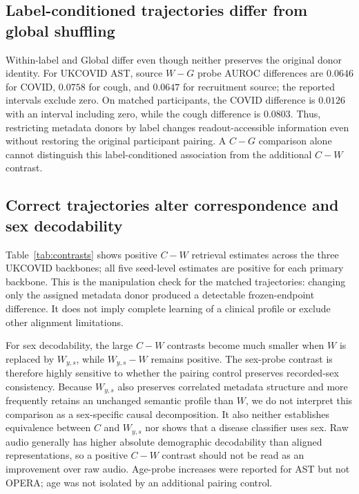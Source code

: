 \documentclass{article}
\newcommand{\wys}{\ensuremath{W_{y,s}}}
\begin{document}
\subsection{Label-conditioned trajectories differ from global shuffling}

Within-label and Global differ even though neither preserves the original
donor identity. For UKCOVID AST, source $W-G$ probe AUROC differences are
$0.0646$ for COVID, $0.0758$ for cough, and $0.0647$ for recruitment source;
the reported intervals exclude zero. On matched participants, the COVID
difference is $0.0126$ with an interval including zero, while the cough
difference is $0.0803$. Thus, restricting metadata donors by label changes
readout-accessible information even without restoring the original participant
pairing. A $C-G$ comparison alone cannot distinguish this label-conditioned
association from the additional $C-W$ contrast.


\subsection{Correct trajectories alter correspondence and sex decodability}

Table~\ref{tab:contrasts} shows positive $C-W$ retrieval estimates across the
three UKCOVID backbones; all five seed-level estimates are positive for each
primary backbone. This is the manipulation check for the matched trajectories:
changing only the assigned metadata donor produced a detectable frozen-endpoint
difference. It does not imply complete learning of a clinical profile or
exclude other alignment limitations.

For sex decodability, the large $C-W$ contrasts become much smaller when $W$
is replaced by \wys{}, while $\wys{}-W$ remains positive. The sex-probe
contrast is therefore highly sensitive to whether the pairing control preserves
recorded-sex consistency. Because \wys{} also preserves correlated metadata
structure and more frequently retains an unchanged semantic profile than $W$,
we do not interpret this comparison as a sex-specific causal decomposition.
It also neither establishes equivalence between $C$ and \wys{} nor shows that
a disease classifier uses sex.
Raw audio generally has higher absolute demographic decodability than aligned
representations, so a positive $C-W$ contrast should not be read as an
improvement over raw audio. Age-probe increases were reported for AST but not
OPERA; age was not isolated by an additional pairing control.
\end{document}
